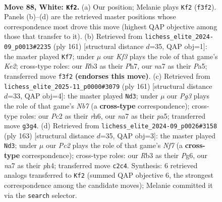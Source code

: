 \documentclass[11pt]{article}
\begin{document}
\clearpage

\begin{figure}[p]\centering
\begin{subfigure}{0.46\textwidth}\centering
\resizebox{\linewidth}{!}{%
\newchessgame
\chessboard[
  setfen={r7/n7/P2k4/8/8/1R3KPP/2P1B3/8 w - - 9 88},
  showmover=false,
  pgfstyle=straightmove, color=movearrow, markmove={f3-f2}
]}
\caption{}
\end{subfigure}\hfill
\begin{subfigure}{0.46\textwidth}\centering
\resizebox{\linewidth}{!}{%
\newchessgame
\chessboard[
  setfen={8/4k2p/8/pp4p1/1b6/8/8/1K6 b - - 25 81},
  showmover=false,
  pgfstyle=straightmove, color=movearrow, markmove={e7-f7}
]}
\caption{}
\end{subfigure}
\\[4pt]
\begin{subfigure}{0.46\textwidth}\centering
\resizebox{\linewidth}{!}{%
\newchessgame
\chessboard[
  setfen={8/8/p1k1K2R/Pbp5/8/8/1n6/4B3 b - - 40 81},
  showmover=false,
  pgfstyle=straightmove, color=movearrow, markmove={b2-d3}
]}
\caption{}
\end{subfigure}\hfill
\begin{subfigure}{0.46\textwidth}\centering
\resizebox{\linewidth}{!}{%
\newchessgame
\chessboard[
  setfen={8/8/6p1/5k1p/4bp1P/8/5n1K/R7 b - - 5 82},
  showmover=false,
  pgfstyle=straightmove, color=movearrow, markmove={f2-d3}
]}
\caption{}
\end{subfigure}
\caption{\textbf{Move 88, White: \texttt{Kf2}.} (a) Our position; Melanie plays \texttt{Kf2} (\texttt{f3f2}). Panels (b)--(d) are the retrieved master positions whose correspondence most drove this move (highest QAP objective among those that transfer to it). (b) Retrieved from \texttt{lichess\_elite\_2024-09\_p0013\#2235} (ply 161) [structural distance $d$=35, QAP obj=1]: the master played \texttt{Kf7}; under $\mu$ our \emph{Kf3} plays the role of that game's \emph{Ke2}; cross-type roles: our \emph{R}b3 as their \emph{P}h7, our \emph{n}a7 as their \emph{P}a5; transferred move \texttt{f3f2} \textbf{(endorses this move)}. (c) Retrieved from \texttt{lichess\_elite\_2025-11\_p0000\#3079} (ply 161) [structural distance $d$=33, QAP obj=4]: the master played \texttt{Nd3}; under $\mu$ our \emph{Pg3} plays the role of that game's \emph{Nb7} (a \textbf{cross-type} correspondence); cross-type roles: our \emph{P}c2 as their \emph{r}h6, our \emph{n}a7 as their \emph{p}a5; transferred move \texttt{g3g4}. (d) Retrieved from \texttt{lichess\_elite\_2024-09\_p0026\#3158} (ply 163) [structural distance $d$=35, QAP obj=3]: the master played \texttt{Nd3}; under $\mu$ our \emph{Pc2} plays the role of that game's \emph{Nf7} (a \textbf{cross-type} correspondence); cross-type roles: our \emph{R}b3 as their \emph{P}g6, our \emph{n}a7 as their \emph{p}h4; transferred move \texttt{c2c4}. Synthesis: 6 retrieved analogs transferred to \texttt{Kf2} (summed QAP objective 6, the strongest correspondence among the candidate moves); Melanie committed it via the \texttt{search} selector.}
\label{fig:thought-m174}
\end{figure}
\end{document}
